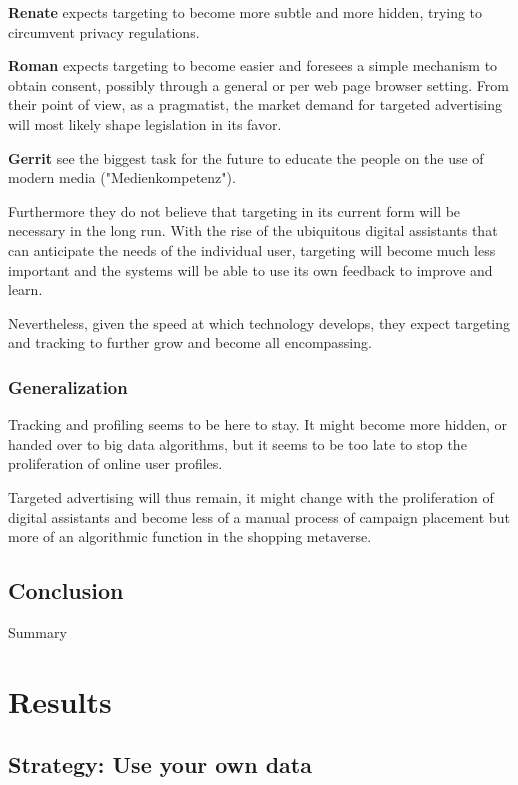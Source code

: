 \textbf{Renate} expects targeting to become more subtle and more hidden, trying to circumvent privacy regulations.

\textbf{Roman} expects targeting to become easier and foresees a simple mechanism to obtain consent, possibly through a general or per web page browser setting. From their point of view, as a pragmatist, the market demand for targeted advertising will most likely shape legislation in its favor.

\textbf{Gerrit} see the biggest task for the future to educate the people on the use of modern media ("Medienkompetenz").

Furthermore they do not believe that targeting in its current form will be necessary in the long run. With the rise of the ubiquitous digital assistants that can anticipate the needs of the individual user, targeting will become much less important and the systems will be able to use its own feedback to improve and learn.

Nevertheless, given the speed at which technology develops, they expect targeting and tracking to further grow and become all encompassing.

\subsubsection{Generalization}

Tracking and profiling seems to be here to stay. It might become more hidden, or handed over to big data algorithms, but it seems to be too late to stop the proliferation of online user profiles. 

Targeted advertising will thus remain, it might change with the proliferation of digital assistants and become less of a manual process of campaign placement but more of an algorithmic function in the shopping metaverse.

\subsection{Conclusion}

Summary

\pagebreak
\section{Results}

\onehalfspacing

\subsection{Strategy: Use your own data}

